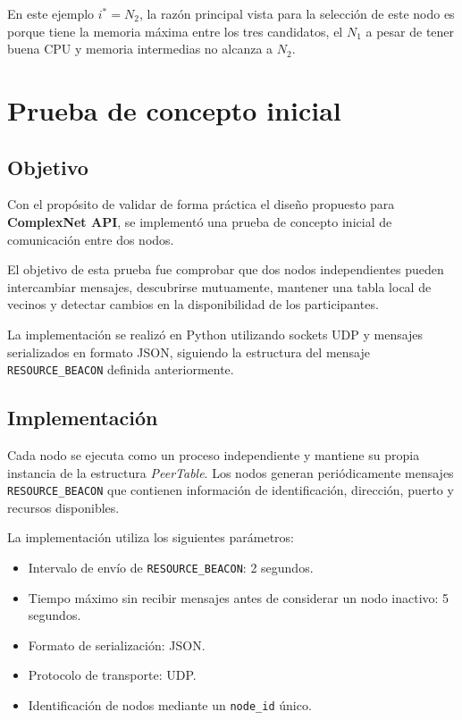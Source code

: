 \documentclass{article}
\begin{document}
En este ejemplo $i^* = N_2$, la razón principal vista para la selección de este nodo es porque tiene la memoria máxima entre los tres candidatos, el $N_1$ a pesar de tener buena CPU y memoria intermedias no alcanza a $N_2$.

\section{Prueba de concepto inicial}

\subsection{Objetivo}

Con el propósito de validar de forma práctica el diseño propuesto para \textbf{ComplexNet API}, se implementó una prueba de concepto inicial de comunicación entre dos nodos.

El objetivo de esta prueba fue comprobar que dos nodos independientes pueden intercambiar mensajes, descubrirse mutuamente, mantener una tabla local de vecinos y detectar cambios en la disponibilidad de los participantes.

La implementación se realizó en Python utilizando sockets UDP y mensajes serializados en formato JSON, siguiendo la estructura del mensaje \texttt{RESOURCE\_BEACON} definida anteriormente.

\subsection{Implementación}

Cada nodo se ejecuta como un proceso independiente y mantiene su propia instancia de la estructura \textit{PeerTable}. Los nodos generan periódicamente mensajes \texttt{RESOURCE\_BEACON} que contienen información de identificación, dirección, puerto y recursos disponibles.

La implementación utiliza los siguientes parámetros:

\begin{itemize}
    \item Intervalo de envío de \texttt{RESOURCE\_BEACON}: 2 segundos.
    \item Tiempo máximo sin recibir mensajes antes de considerar un nodo inactivo: 5 segundos.
    \item Formato de serialización: JSON.
    \item Protocolo de transporte: UDP.
    \item Identificación de nodos mediante un \texttt{node\_id} único.
\end{itemize}
\end{document}
